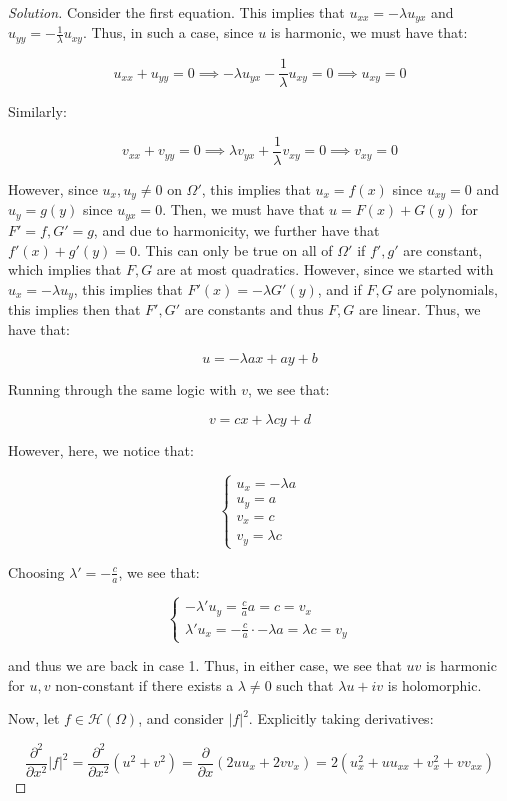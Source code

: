 \documentclass[10pt]{article}
\begin{document}
\begin{proof}[Solution]
Consider the first equation. This implies that $u_{xx} = -\lambda u_{yx}$ and $u_{yy} = -\frac{1}{\lambda} u_{xy}$. Thus, in such a case, since $u$ is harmonic, we must have that:

$$ u_{xx} + u_{yy} = 0 \implies  -\lambda u_{yx} - \frac{1}{\lambda} u_{xy} = 0 \implies u_{xy} = 0$$

Similarly:

$$ v_{xx} + v_{yy}= 0 \implies \lambda v_{yx} + \frac{1}{\lambda} v_{xy} = 0 \implies v_{xy} = 0$$

However, since $u_x, u_y \not = 0$ on $\Omega'$, this implies that $u_x = f(x)$ since $u_{xy} = 0$ and $u_y = g(y)$ since $u_{yx}= 0$. Then, we must have that $u =  F(x) + G(y)$ for $F' = f, G' = g$, and due to harmonicity, we further have that $f'(x) + g'(y) = 0$. This can only be true on all of $\Omega'$ if $f', g'$ are constant, which implies that $F, G$ are at most quadratics. However, since we started with $u_x = -\lambda u_y$, this implies that $F'(x) = -\lambda G'(y)$, and if $F,G$ are polynomials, this implies then that $F', G'$ are constants and thus $F,G$ are linear. Thus, we have that:

$$u = -\lambda ax + a y + b$$

Running through the same logic with $v$, we see that:

$$ v =cx +\lambda c y + d $$

However, here, we notice that:

$$\begin{cases} u_x = -\lambda a \\ u_y = a \\ v_x = c \\ v_y = \lambda c \end{cases}$$

Choosing $\lambda' = - \frac{c}{a}$, we see that:

$$\begin{cases} -\lambda' u_y = \frac{c}{a} a = c = v_x \\ \lambda' u_x = -\frac{c}{a} \cdot - \lambda a =\lambda c = v_y \end{cases} $$

and thus we are back in case 1. Thus, in either case, we see that $uv$ is harmonic for $u,v$ non-constant if there exists a $\lambda \not = 0$ such that $\lambda u + iv$ is holomorphic.

Now, let $f \in \mathcal{H}(\Omega)$, and consider $|f|^2$. Explicitly taking derivatives:

$$\frac{\partial^2}{\partial x^2}|f|^2 = \frac{\partial^2}{\partial x^2}( u^2 + v^2 )= \frac{\partial}{\partial x} (2u u_x + 2v v_x) = 2( u_x^2 + u u_{xx} + v_x^2 + v v_{xx}) $$


\end{proof}
\end{document}
